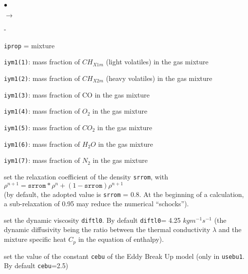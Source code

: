 {{{\begin{list}{$\bullet$}{}
\begin{list}{$\rightarrow$}{}
\begin{list}{}{}
\begin{list}{-}{}
\begin{list}{\texttt{iprop} = }{}
                            mixture
                      \item \texttt{iym1(1)}: mass fraction of
                            $CH_{X1m}$ (light volatiles) in the gas
                            mixture
                      \item \texttt{iym1(2)}: mass fraction of
                            $CH_{X2m}$ (heavy volatiles) in the gas
                            mixture
                      \item \texttt{iym1(3)}: mass fraction of
                            CO in the gas mixture
                      \item \texttt{iym1(4)}: mass fraction of
                            $O_2$ in the gas mixture
                      \item \texttt{iym1(5)}: mass fraction of
                            $CO_2$ in the gas mixture
                      \item \texttt{iym1(6)}: mass fraction of
                            $H_2O$ in the gas mixture
                      \item \texttt{iym1(7)}: mass fraction of
                            $N_2$ in the gas mixture
                     \end{list}
              \end{list}
             \end{list}
      \end{list}

 \item set the relaxation coefficient of the density \texttt{srrom}, with \\
$\rho^{n+1}=\texttt{srrom}*\rho^{n}+(1-\texttt{srrom})\rho^{n+1}$\\
(by default, the adopted value is \texttt{srrom} = 0.8. At the
      beginning of a calculation, a sub-relaxation of 0.95 may reduce
      the numerical ``schocks'').

 \item set the dynamic viscosity \texttt{diftl0}. By default
      \texttt{diftl0}= 4.25 $kgm^{-1}s^{-1}$
(the dynamic diffusivity being the ratio between the thermal
      conductivity $\lambda$ and the mixture specific heat $C_p$ in the
      equation of enthalpy).

 \item set the value of the constant \texttt{cebu} of the Eddy Break
      Up model (only in \texttt{usebu1}. By default \texttt{cebu}=2.5)
\end{list}

}}}
